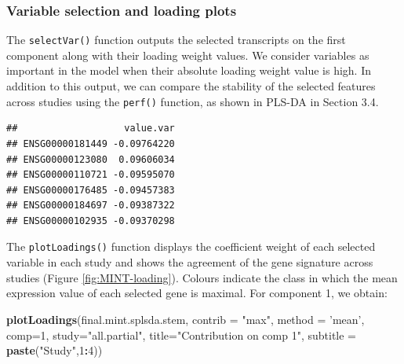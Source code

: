 \documentclass[]{book}
\newenvironment{Shaded}{\begin{snugshade}}{\end{snugshade}}
\newcommand{\CommentTok}[1]{\textcolor[rgb]{0.56,0.35,0.01}{\textit{#1}}}
\newcommand{\DataTypeTok}[1]{\textcolor[rgb]{0.13,0.29,0.53}{#1}}
\newcommand{\DecValTok}[1]{\textcolor[rgb]{0.00,0.00,0.81}{#1}}
\newcommand{\KeywordTok}[1]{\textcolor[rgb]{0.13,0.29,0.53}{\textbf{#1}}}
\newcommand{\NormalTok}[1]{#1}
\newcommand{\OperatorTok}[1]{\textcolor[rgb]{0.81,0.36,0.00}{\textbf{#1}}}
\newcommand{\StringTok}[1]{\textcolor[rgb]{0.31,0.60,0.02}{#1}}
\begin{document}
\hypertarget{variable-selection-and-loading-plots}{%
\subsubsection{Variable selection and loading plots}\label{variable-selection-and-loading-plots}}

The \texttt{selectVar()} function outputs the selected transcripts on the first component along with their loading weight values. We consider variables as important in the model when their absolute loading weight value is high. In addition to this output, we can compare the stability of the selected features across studies using the \texttt{perf()} function, as shown in PLS-DA in Section 3.4.

\begin{Shaded}
\end{Shaded}

\begin{verbatim}
##                   value.var
## ENSG00000181449 -0.09764220
## ENSG00000123080  0.09606034
## ENSG00000110721 -0.09595070
## ENSG00000176485 -0.09457383
## ENSG00000184697 -0.09387322
## ENSG00000102935 -0.09370298
\end{verbatim}

The \texttt{plotLoadings()} function displays the coefficient weight of each selected variable in each study and shows the agreement of the gene signature across studies (Figure \ref{fig:MINT-loading}). Colours indicate the class in which the mean expression value of each selected gene is maximal. For component 1, we obtain:

\begin{Shaded}
\begin{Highlighting}[]
\KeywordTok{plotLoadings}\NormalTok{(final.mint.splsda.stem, }\DataTypeTok{contrib =} \StringTok{"max"}\NormalTok{, }\DataTypeTok{method =} \StringTok{'mean'}\NormalTok{, }\DataTypeTok{comp=}\DecValTok{1}\NormalTok{, }
             \DataTypeTok{study=}\StringTok{"all.partial"}\NormalTok{, }\DataTypeTok{title=}\StringTok{"Contribution on comp 1"}\NormalTok{, }
             \DataTypeTok{subtitle =} \KeywordTok{paste}\NormalTok{(}\StringTok{"Study"}\NormalTok{,}\DecValTok{1}\OperatorTok{:}\DecValTok{4}\NormalTok{))}
\end{Highlighting}
\end{Shaded}
\end{document}
